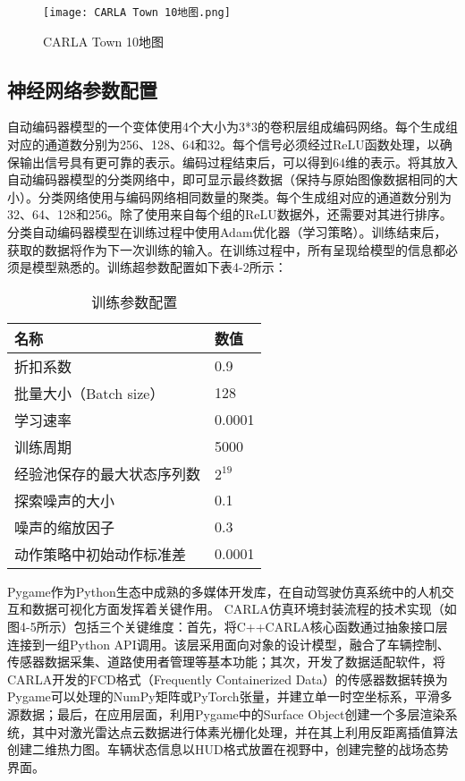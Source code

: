 \begin{figure}[hbt]
	\centering
	\texttt{[image: CARLA Town 10地图.png]}
	\caption{CARLA Town 10地图}
	\label{f.example}
\end{figure}

\subsection{神经网络参数配置  }


自动编码器模型的一个变体使用4个大小为3*3的卷积层组成编码网络。每个生成组对应的通道数分别为256、128、64和32。每个信号必须经过ReLU函数处理，以确保输出信号具有更可靠的表示。编码过程结束后，可以得到64维的表示。将其放入自动编码器模型的分类网络中，即可显示最终数据（保持与原始图像数据相同的大小）。分类网络使用与编码网络相同数量的聚类。每个生成组对应的通道数分别为32、64、128和256。除了使用来自每个组的ReLU数据外，还需要对其进行排序。分类自动编码器模型在训练过程中使用Adam优化器（学习策略）。训练结束后，获取的数据将作为下一次训练的输入。在训练过程中，所有呈现给模型的信息都必须是模型熟悉的。训练超参数配置如下表4-2所示：

\begin{table}[htbp]
	\centering
	\caption{训练参数配置}
	\label{tab:params}
	\begin{tabular}{ll}
		\toprule
		\textbf{名称}                     & \textbf{数值}                \\
		\midrule
		折扣系数                        & 0.9                         \\
		批量大小（Batch size）          & 128                         \\
		学习速率                        & 0.0001                      \\
		训练周期                        & 5000                        \\
		经验池保存的最大状态序列数       & $2^{19}$                    \\
		探索噪声的大小                   & 0.1                         \\
		噪声的缩放因子                   & 0.3                         \\
		动作策略中初始动作标准差         & 0.0001                      \\
		\bottomrule
	\end{tabular}
\end{table}

Pygame作为Python生态中成熟的多媒体开发库，在自动驾驶仿真系统中的人机交互和数据可视化方面发挥着关键作用。 CARLA仿真环境封装流程的技术实现（如图4-5所示）包括三个关键维度：首先，将C++CARLA核心函数通过抽象接口层连接到一组Python API调用。该层采用面向对象的设计模型，融合了车辆控制、传感器数据采集、道路使用者管理等基本功能；其次，开发了数据适配软件，将CARLA开发的FCD格式（Frequently Containerized Data）的传感器数据转换为Pygame可以处理的NumPy矩阵或PyTorch张量，并建立单一时空坐标系，平滑多源数据；最后，在应用层面，利用Pygame中的Surface Object创建一个多层渲染系统，其中对激光雷达点云数据进行体素光栅化处理，并在其上利用反距离插值算法创建二维热力图。车辆状态信息以HUD格式放置在视野中，创建完整的战场态势界面。

